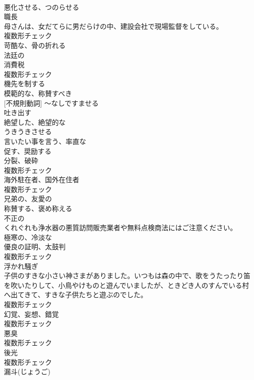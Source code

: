 \documentclass[8pt]{extreport}
\begin{document}
\begin{CJK}{UTF8}{min}
\\	[動詞]	悪化させる、つのらせる	
\\	[名詞]	職⻑	
\\	母さんは、女だてらに男だらけの中、建設会社で現場監督をしている。	
\\	複数形チェック
\\	[形容詞]	苛酷な、骨の折れる	
\\	[形容詞]	法廷の	
\\	[名詞]	消費税	
\\	複数形チェック
\\	[動詞]	機先を制する	
\\	[形容詞]	模範的な、称賛すべき	
\\	[動詞] [不規則動詞]	〜なしですませる	
\\	[動詞]	吐き出す	
\\	[形容詞]	絶望した、絶望的な	
\\	[動詞]	うきうきさせる	
\\	[形容詞]	言いたい事を言う、率直な	
\\	[動詞]	促す、奨励する	
\\	[名詞]	分裂、破砕	
\\	複数形チェック
\\	[名詞]	海外駐在者、国外在住者	
\\	複数形チェック
\\	[形容詞]	兄弟の、友愛の	
\\	[動詞]	称賛する、褒め称える	
\\	[形容詞]	不正の	
\\	くれぐれも浄水器の悪質訪問販売業者や無料点検商法にはご注意ください。	
\\	[形容詞]	極寒の、冷淡な	
\\	[名詞]	優良の証明、太鼓判	
\\	複数形チェック
\\	[名詞]	浮かれ騒ぎ	
\\	子供のすきな小さい神さまがありました。いつもは森の中で、歌をうたったり笛を吹いたりして、小鳥やけものと遊んでいましたが、ときどき人のすんでいる村へ出てきて、すきな子供たちと遊ぶのでした。	
\\	複数形チェック
\\	[名詞]	幻覚、妄想、錯覚	
\\	複数形チェック
\\	[名詞]	悪臭	
\\	複数形チェック
\\	[名詞]	後光	
\\	複数形チェック
\\	[名詞]	漏斗(じょうご)	

\end{CJK}
\end{document}

